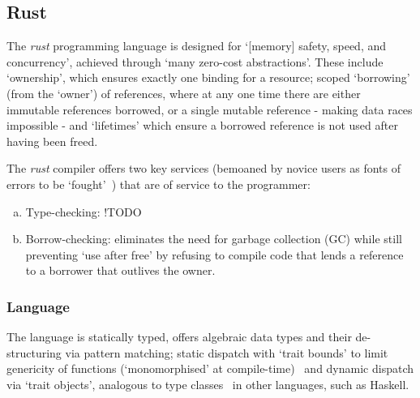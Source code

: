 \subsection{Rust} \label{bg:rust}

The \emph{rust} programming language is designed for `[memory] safety, speed, and concurrency', achieved through `many zero-cost abstractions'. These include `ownership', which ensures exactly one binding for a resource; scoped `borrowing' (from the `owner') of references, where at any one time there are either immutable references borrowed, or a single mutable reference - making data races impossible - and `lifetimes' which ensure a borrowed reference is not used after having been freed. \cite{rust_book}

The \emph{rust} compiler offers two key services (bemoaned by novice users as fonts of errors to be `fought'~\cite{fighting_borrowck}) that are of service to the programmer:
\begin{enumerate}[(a)] \label{bg:rust:compiler-services}
    \item Type-checking: !TODO
    \item Borrow-checking: eliminates the need for garbage collection (GC) while still preventing `use after free' by refusing to compile code that lends a reference to a borrower that outlives the owner.~\cite{rust_book, rust_nomicon}
\end{enumerate}

\subsubsection{Language} \label{bg:rust:lang}

The language is statically typed, offers algebraic data types  and their de-structuring via pattern matching; \cite{rust_match_mut_move} static dispatch with `trait bounds' to limit genericity of functions (`monomorphised' at compile-time)~\cite{rust_book} and dynamic dispatch via `trait objects', analogous to type classes~\cite{rust_functional} in other languages, such as Haskell. \cite{rust_type_system}

